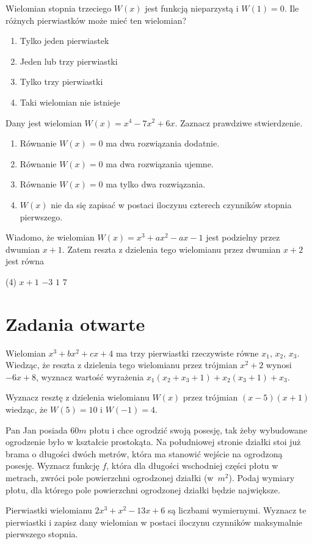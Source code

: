 \zadanie Wielomian stopnia trzeciego $W(x)$ jest funkcją nieparzystą i $W(1) = 0$. Ile różnych pierwiastków może mieć ten wielomian?
\begin{enumerate}[label=\alph*)]
	\item Tylko jeden pierwiastek
	\item Jeden lub trzy pierwiastki
	\item Tylko trzy pierwiastki %
	\item Taki wielomian nie istnieje
\end{enumerate}

\zadanie Dany jest wielomian $W(x) = x^4 - 7x^2 + 6x$. Zaznacz prawdziwe stwierdzenie.
\begin{enumerate}[label=\alph*)]
	\item Równanie $W(x) = 0$ ma dwa rozwiązania dodatnie. %
	\item Równanie $W(x) = 0$ ma dwa rozwiązania ujemne.
	\item Równanie $W(x) = 0$ ma tylko dwa rozwiązania.
	\item $W(x)$ nie da się zapisać w postaci iloczynu czterech czynników stopnia pierwszego.
\end{enumerate}

\zadanie Wiadomo, że wielomian $W(x) = x^3 + ax^2 - ax - 1$ jest podzielny przez dwumian $x + 1$. Zatem reszta z dzielenia tego wielomianu przez dwumian $x + 2$ jest równa
\begin{tasks}(4)
	\task $x + 1$
	\task $-3$ %
	\task $1$
	\task $7$
\end{tasks}

\section{Zadania otwarte}

\zadanie Wielomian $x^3 + bx^2 + cx + 4$ ma trzy pierwiastki rzeczywiste równe $x_1,\, x_2,\, x_3$. Wiedząc, że reszta z dzielenia tego wielomianu przez trójmian $x^2 + 2$ wynosi $-6x + 8$, wyznacz wartość wyrażenia $x_1(x_2 + x_3 + 1) + x_2(x_3 + 1) + x_3$. %

\zadanie Wyznacz resztę z dzielenia wielomianu $W(x)$ przez trójmian $(x - 5)(x + 1)$ wiedząc, że $W(5) = 10$ i $W(-1) = 4$. %

\zadanie Pan Jan posiada $60m$ płotu i chce ogrodzić swoją posesję, tak żeby wybudowane ogrodzenie było w kształcie prostokąta. Na południowej stronie działki stoi już brama o długości dwóch metrów, która ma stanowić wejście na ogrodzoną posesję. Wyznacz funkcję $f$, która dla długości wschodniej części płotu w metrach, zwróci pole powierzchni ogrodzonej działki (w~$m^2$). Podaj wymiary płotu, dla którego pole powierzchni ogrodzonej działki będzie największe. %

\zadanie Pierwiastki wielomianu $2x^3 + x^2 - 13x + 6$ są liczbami wymiernymi. Wyznacz te pierwiastki i zapisz dany wielomian w postaci iloczynu czynników maksymalnie pierwszego stopnia. %

